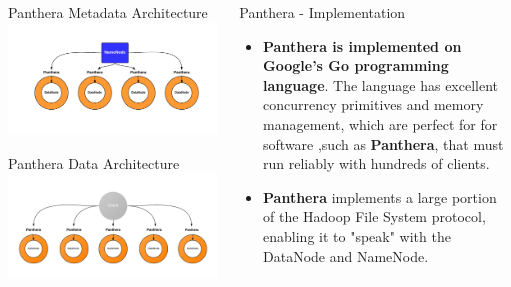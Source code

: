 \documentclass[final]{beamer} %
\begin{document}
\begin{frame}
\begin{columns}[t]
\begin{column}{0.32\textwidth}
	  \begin{block}{Panthera Metadata Architecture}
	  \includegraphics[scale=1]{assets/panthera_metadata.pdf}
      \end{block}
      
      \begin{block}{Panthera Data Architecture}
      \includegraphics[scale=1]{assets/panthera_architecture.pdf}
      \end{block}

     \end{column}

    \begin{column}{0.32\textwidth}

	    
	\begin{block}{Panthera - Implementation}
	\begin{itemize}
		\item \textbf{Panthera is implemented on Google's Go programming language}. The language has excellent concurrency primitives and memory management, which are perfect for
		for software ,such as \textbf{Panthera}, that must run reliably with hundreds of clients.
		\item \textbf{Panthera} implements a large portion of the Hadoop File System protocol, enabling it to "speak" with the DataNode and NameNode.
	\end{itemize}
	\end{block}


\end{column}
\end{columns}
\end{frame}
\end{document}
